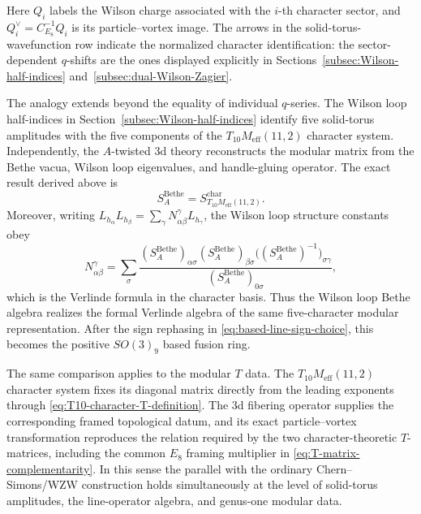 \documentclass[11pt,a4paper]{article}
\numberwithin{equation}{section}
\begin{document}
Here $Q_i$ labels the Wilson charge associated with the $i$-th character sector, and $Q_i^\vee=C_{E_8}^{-1}Q_i$ is its particle--vortex image.  The arrows in the solid-torus-wavefunction row indicate the normalized character identification: the sector-dependent $q$-shifts are the ones displayed explicitly in Sections~\ref{subsec:Wilson-half-indices} and~\ref{subsec:dual-Wilson-Zagier}.

The analogy extends beyond the equality of individual $q$-series.  The Wilson loop half-indices in Section~\ref{subsec:Wilson-half-indices} identify five solid-torus amplitudes with the five components of the $T_{10}M_{\mathrm{eff}}(11,2)$ character system.  Independently, the $A$-twisted 3d theory reconstructs the modular matrix from the Bethe vacua, Wilson loop eigenvalues, and handle-gluing operator.  The exact result derived above is
\begin{equation}
  S_A^{\mathrm{Bethe}}
  =S_{T_{10}M_{\mathrm{eff}}(11,2)}^{\mathrm{char}}.
  \label{eq:CSWZW-S-comparison}
\end{equation}
Moreover, writing
$L_{h_\alpha}L_{h_\beta}=\sum_\gamma N^{\gamma}_{\alpha\beta}L_{h_\gamma}$,
the Wilson loop structure constants obey
\begin{equation}
  N^{\gamma}_{\alpha\beta}
  =\sum_{\sigma}
  \frac{
    (S_A^{\mathrm{Bethe}})_{\alpha\sigma}
    (S_A^{\mathrm{Bethe}})_{\beta\sigma}
    \bigl((S_A^{\mathrm{Bethe}})^{-1}\bigr)_{\sigma\gamma}
  }{
    (S_A^{\mathrm{Bethe}})_{0\sigma}
  },
  \label{eq:CSWZW-Verlinde-diagonalization}
\end{equation}
which is the Verlinde formula in the character basis.  Thus the Wilson loop Bethe algebra realizes the formal Verlinde algebra of the same five-character modular representation.  After the sign rephasing in \eqref{eq:based-line-sign-choice}, this becomes the positive $SO(3)_9$ based fusion ring.

The same comparison applies to the modular $T$ data.  The $T_{10}M_{\mathrm{eff}}(11,2)$ character system fixes its diagonal matrix directly from the leading exponents through \eqref{eq:T10-character-T-definition}.  The 3d fibering operator supplies the corresponding framed topological datum, and its exact particle--vortex transformation reproduces the relation required by the two character-theoretic $T$-matrices, including the common $E_8$ framing multiplier in \eqref{eq:T-matrix-complementarity}.  In this sense the parallel with the ordinary Chern--Simons/WZW construction holds simultaneously at the level of solid-torus amplitudes, the line-operator algebra, and genus-one modular data.
\end{document}
